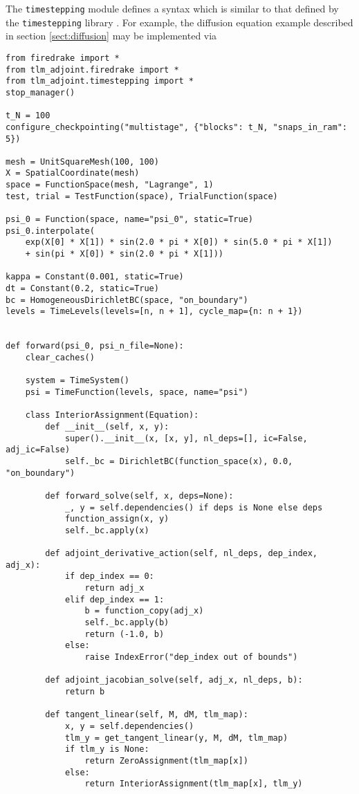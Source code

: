 \documentclass[11pt]{article}
\begin{document}
The \texttt{timestepping} module defines a syntax which is similar to that
defined by the \texttt{timestepping} library \citep[see][]{maddison2014}. For
example, the diffusion equation example described in section
\ref{sect:diffusion} may be implemented via
\begin{lstlisting}
from firedrake import *
from tlm_adjoint.firedrake import *
from tlm_adjoint.timestepping import *
stop_manager()

t_N = 100
configure_checkpointing("multistage", {"blocks": t_N, "snaps_in_ram": 5})

mesh = UnitSquareMesh(100, 100)
X = SpatialCoordinate(mesh)
space = FunctionSpace(mesh, "Lagrange", 1)
test, trial = TestFunction(space), TrialFunction(space)

psi_0 = Function(space, name="psi_0", static=True)
psi_0.interpolate(
    exp(X[0] * X[1]) * sin(2.0 * pi * X[0]) * sin(5.0 * pi * X[1])
    + sin(pi * X[0]) * sin(2.0 * pi * X[1]))

kappa = Constant(0.001, static=True)
dt = Constant(0.2, static=True)
bc = HomogeneousDirichletBC(space, "on_boundary")
levels = TimeLevels(levels=[n, n + 1], cycle_map={n: n + 1})


def forward(psi_0, psi_n_file=None):
    clear_caches()

    system = TimeSystem()
    psi = TimeFunction(levels, space, name="psi")

    class InteriorAssignment(Equation):
        def __init__(self, x, y):
            super().__init__(x, [x, y], nl_deps=[], ic=False, adj_ic=False)
            self._bc = DirichletBC(function_space(x), 0.0, "on_boundary")

        def forward_solve(self, x, deps=None):
            _, y = self.dependencies() if deps is None else deps
            function_assign(x, y)
            self._bc.apply(x)

        def adjoint_derivative_action(self, nl_deps, dep_index, adj_x):
            if dep_index == 0:
                return adj_x
            elif dep_index == 1:
                b = function_copy(adj_x)
                self._bc.apply(b)
                return (-1.0, b)
            else:
                raise IndexError("dep_index out of bounds")

        def adjoint_jacobian_solve(self, adj_x, nl_deps, b):
            return b

        def tangent_linear(self, M, dM, tlm_map):
            x, y = self.dependencies()
            tlm_y = get_tangent_linear(y, M, dM, tlm_map)
            if tlm_y is None:
                return ZeroAssignment(tlm_map[x])
            else:
                return InteriorAssignment(tlm_map[x], tlm_y)


\end{lstlisting}
\end{document}
